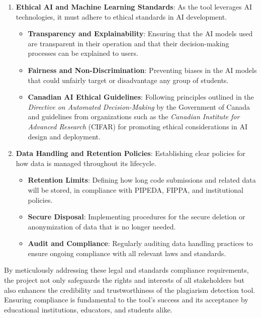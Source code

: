 \documentclass[12pt]{article}
\begin{document}
\begin{enumerate}
    \item \textbf{Ethical AI and Machine Learning Standards}: As the tool leverages AI
    technologies, it must adhere to ethical standards in AI development.
    \begin{itemize}
        \item \textbf{Transparency and Explainability}: Ensuring that the AI models used
        are transparent in their operation and that their decision-making processes can be
        explained to users.
        \item \textbf{Fairness and Non-Discrimination}: Preventing biases in the AI models
        that could unfairly target or disadvantage any group of students.
        \item \textbf{Canadian AI Ethical Guidelines}: Following principles outlined in the 
        \textit{Directive on Automated Decision-Making} by the Government of Canada and 
        guidelines from organizations such as the \textit{Canadian Institute for Advanced Research} (CIFAR) 
        for promoting ethical considerations in AI design and deployment.
    \end{itemize}

    \item \textbf{Data Handling and Retention Policies}: Establishing clear policies for
    how data is managed throughout its lifecycle.
    \begin{itemize}
        \item \textbf{Retention Limits}: Defining how long code submissions and related
        data will be stored, in compliance with PIPEDA, FIPPA, and institutional policies.
        \item \textbf{Secure Disposal}: Implementing procedures for the secure deletion or
        anonymization of data that is no longer needed.
        \item \textbf{Audit and Compliance}: Regularly auditing data handling practices to
        ensure ongoing compliance with all relevant laws and standards.
    \end{itemize}
\end{enumerate}

By meticulously addressing these legal and standards compliance requirements, the
project not only safeguards the rights and interests of all stakeholders but also
enhances the credibility and trustworthiness of the plagiarism detection tool. Ensuring
compliance is fundamental to the tool's success and its acceptance by educational
institutions, educators, and students alike.
\end{document}
